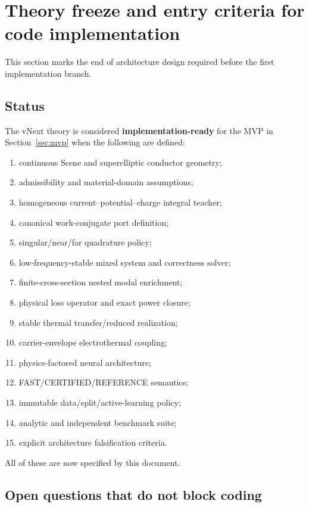 \section{Theory freeze and entry criteria for code implementation}
\label{sec:theory-freeze}

This section marks the end of architecture design required before the first
implementation branch.

\subsection{Status}

The vNext theory is considered \textbf{implementation-ready} for the MVP in
Section~\ref{sec:mvp} when the following are defined:
\begin{enumerate}
\item continuous Scene and superelliptic conductor geometry;
\item admissibility and material-domain assumptions;
\item homogeneous current--potential--charge integral teacher;
\item canonical work-conjugate port definition;
\item singular/near/far quadrature policy;
\item low-frequency-stable mixed system and correctness solver;
\item finite-cross-section nested modal enrichment;
\item physical loss operator and exact power closure;
\item stable thermal transfer/reduced realization;
\item carrier-envelope electrothermal coupling;
\item physics-factored neural architecture;
\item FAST/CERTIFIED/REFERENCE semantics;
\item immutable data/split/active-learning policy;
\item analytic and independent benchmark suite;
\item explicit architecture falsification criteria.
\end{enumerate}
All of these are now specified by this document.

\subsection{Open questions that do not block coding}

